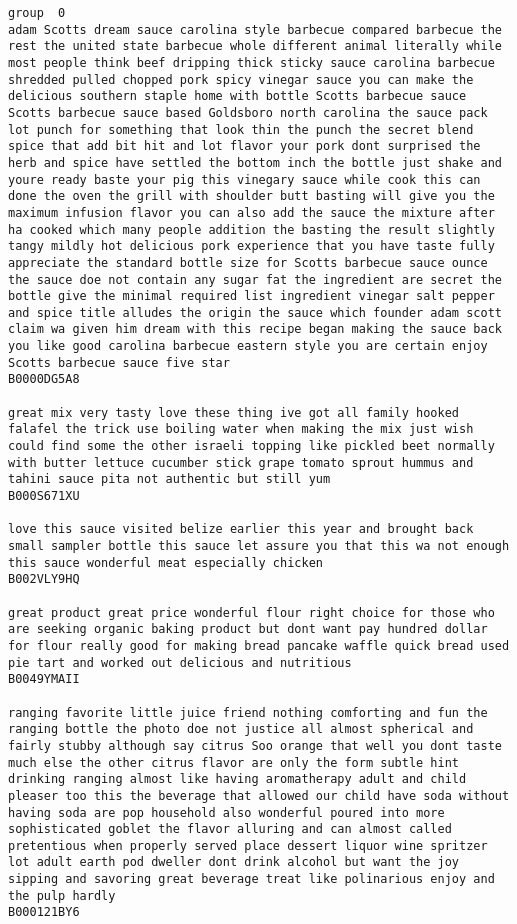 \documentclass[11pt]{article}
\begin{document}
    \begin{Verbatim}[commandchars=\\\{\}]
group  0
adam Scotts dream sauce carolina style barbecue compared barbecue the rest the united state barbecue whole different animal literally while most people think beef dripping thick sticky sauce carolina barbecue shredded pulled chopped pork spicy vinegar sauce you can make the delicious southern staple home with bottle Scotts barbecue sauce Scotts barbecue sauce based Goldsboro north carolina the sauce pack lot punch for something that look thin the punch the secret blend spice that add bit hit and lot flavor your pork dont surprised the herb and spice have settled the bottom inch the bottle just shake and youre ready baste your pig this vinegary sauce while cook this can done the oven the grill with shoulder butt basting will give you the maximum infusion flavor you can also add the sauce the mixture after ha cooked which many people addition the basting the result slightly tangy mildly hot delicious pork experience that you have taste fully appreciate the standard bottle size for Scotts barbecue sauce ounce the sauce doe not contain any sugar fat the ingredient are secret the bottle give the minimal required list ingredient vinegar salt pepper and spice title alludes the origin the sauce which founder adam scott claim wa given him dream with this recipe began making the sauce back you like good carolina barbecue eastern style you are certain enjoy Scotts barbecue sauce five star
B0000DG5A8

great mix very tasty love these thing ive got all family hooked falafel the trick use boiling water when making the mix just wish could find some the other israeli topping like pickled beet normally with butter lettuce cucumber stick grape tomato sprout hummus and tahini sauce pita not authentic but still yum
B000S671XU

love this sauce visited belize earlier this year and brought back small sampler bottle this sauce let assure you that this wa not enough this sauce wonderful meat especially chicken
B002VLY9HQ

great product great price wonderful flour right choice for those who are seeking organic baking product but dont want pay hundred dollar for flour really good for making bread pancake waffle quick bread used pie tart and worked out delicious and nutritious
B0049YMAII

ranging favorite little juice friend nothing comforting and fun the ranging bottle the photo doe not justice all almost spherical and fairly stubby although say citrus Soo orange that well you dont taste much else the other citrus flavor are only the form subtle hint drinking ranging almost like having aromatherapy adult and child pleaser too this the beverage that allowed our child have soda without having soda are pop household also wonderful poured into more sophisticated goblet the flavor alluring and can almost called pretentious when properly served place dessert liquor wine spritzer lot adult earth pod dweller dont drink alcohol but want the joy sipping and savoring great beverage treat like polinarious enjoy and the pulp hardly
B000121BY6


\end{Verbatim}
\end{document}
